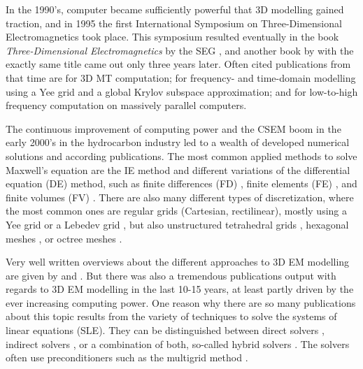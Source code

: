 \documentclass[
    paper,
  ]{geophysics}
\begin{document}
In the 1990's, computer became sufficiently powerful that 3D modelling gained traction, and in 1995 the first International Symposium on Three-Dimensional Electromagnetics took place. This symposium resulted eventually in the book \emph{Three-Dimensional Electromagnetics} by the SEG \citep{B.SEG.99.Oristaglio}, and another book by \cite{B.02.Wannamaker} with the exactly same title came out only three years later. Often cited publications from that time are \cite{RSC.94.Mackie} for 3D MT computation; \cite{RS.94.Druskin} for frequency- and time-domain modelling using a Yee grid and a global Krylov subspace approximation; and \cite{RS.96.Alumbaugh, GJI.97.Newman} for low-to-high frequency computation on massively parallel computers.

The continuous improvement of computing power and the CSEM boom in the early 2000's in the hydrocarbon industry led to a wealth of developed numerical solutions and according publications. The most common applied methods to solve Maxwell's equation are the IE method \citep{GJI.74.Raiche, RS.02.Hursan, GEO.06.Zhdanov, GP.10.Tehrani, CAG.16.Kruglyakov, MGS.17.Kruglyakov} and different variations of the differential equation (DE) method, such as finite differences (FD) \citep{GEO.93.Wang, RSC.94.Mackie, RS.94.Druskin, GEO.09.Streich, CAG.13.Sommer}, finite elements (FE) \citep{GEO.04.Commer, GJI.11.Schwarzbach,GEO.12.daSilva, GJI.13.Grayver, GJI.13.Puzyrev, SEG.16.Zhang}, and finite volumes (FV) \citep{EM.90.Madsen, SIAM.01.Haber, PIER.01.Clemens, GEO.14.Jahandari}. There are also many different types of discretization, where the most common ones are regular grids (Cartesian, rectilinear), mostly using a Yee grid \citep{IEEE.66.Yee} or a Lebedev grid \citep{CMMP.64.Lebedev}, but also unstructured tetrahedral grids \citep{SEG.16.Zhang, CAG.17.Cai}, hexagonal meshes \citep{CAG.14.Cai}, or octree meshes \citep{ECP.07.Haber}.

Very well written overviews about the different approaches to 3D EM modelling are given by \cite{SG.05.Avdeev} and \cite{SG.10.Borner}. But there was also a tremendous publications output with regards to 3D EM modelling in the last 10-15 years, at least partly driven by the ever increasing computing power. One reason why there are so many publications about this topic results from the variety of techniques to solve the systems of linear equations (SLE). They can be distinguished between direct solvers \citep{GEO.09.Streich, GP.14.Chung, GEO.14.Jaysaval, GEO.15.Grayver, SEG.15.Oh, GJI.18.Wang}, indirect solvers \citep{GJI.15.Jaysaval}, or a combination of both, so-called hybrid solvers \citep{GEO.18.Liu}. The solvers often use preconditioners such as the multigrid method \citep{SIAM.02.Aruliah, GJI.16.Jaysaval}.
\end{document}
